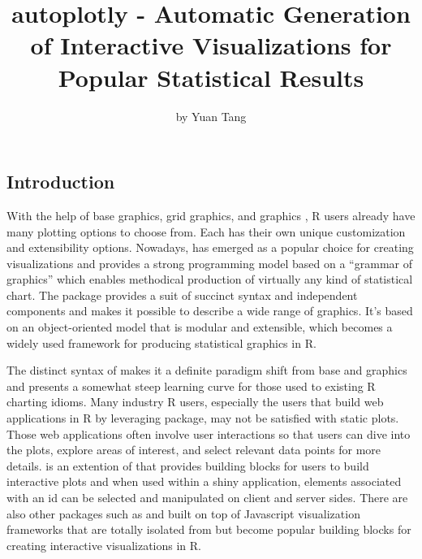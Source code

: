 \title{autoplotly - Automatic Generation of Interactive Visualizations for
Popular Statistical Results}
\author{by Yuan Tang}

\maketitle


\subsection{Introduction}\label{introduction}

With the help of base graphics, grid graphics, and 
graphics \citep{lattice}, R users already have many plotting options to
choose from. Each has their own unique customization and extensibility
options. Nowadays,  has emerged as a popular choice for
creating visualizations \citep{wickham2009ggplot2} and provides a strong
programming model based on a ``grammar of graphics'' which enables
methodical production of virtually any kind of statistical chart. The
 package provides a suit of succinct syntax and independent
components and makes it possible to describe a wide range of graphics.
It's based on an object-oriented model that is modular and extensible,
which becomes a widely used framework for producing statistical graphics
in R.

The distinct syntax of  makes it a definite paradigm shift
from base and  graphics and presents a somewhat steep
learning curve for those used to existing R charting idioms. Many
industry R users, especially the users that build web applications in R
by leveraging  \citep{shiny} package, may not be
satisfied with static plots. Those web applications often involve user
interactions so that users can dive into the plots, explore areas of
interest, and select relevant data points for more details.
 \citep{ggiraph} is an extention of  that
provides building blocks for users to build interactive plots and when
used within a shiny application, elements associated with an id can be
selected and manipulated on client and server sides. There are also
other packages such as  \cite{d3r} and 
\cite{plotly} built on top of Javascript visualization frameworks that
are totally isolated from  but become popular building
blocks for creating interactive visualizations in R.

